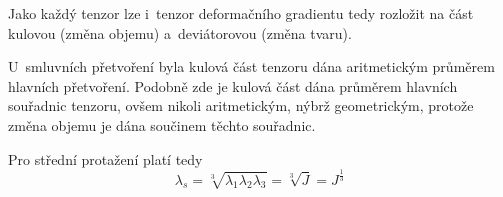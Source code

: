 Jako každý tenzor lze i~tenzor deformačního gradientu tedy rozložit na část kulovou (změna objemu) a~deviátorovou (změna tvaru). 

U~smluvních přetvoření byla kulová část tenzoru dána aritmetickým průměrem hlavních přetvoření. Podobně zde je kulová část dána průměrem hlavních souřadnic tenzoru, ovšem nikoli aritmetickým, nýbrž geometrickým, protože změna objemu je dána součinem těchto souřadnic.

Pro střední protažení platí tedy
\begin{equation}
	\lambda_s
	= \sqrt[3]{\lambda_1 \lambda_2 \lambda_3}
	= \sqrt[3]{J}
	= J^{\frac{1}{3}}
\end{equation}



